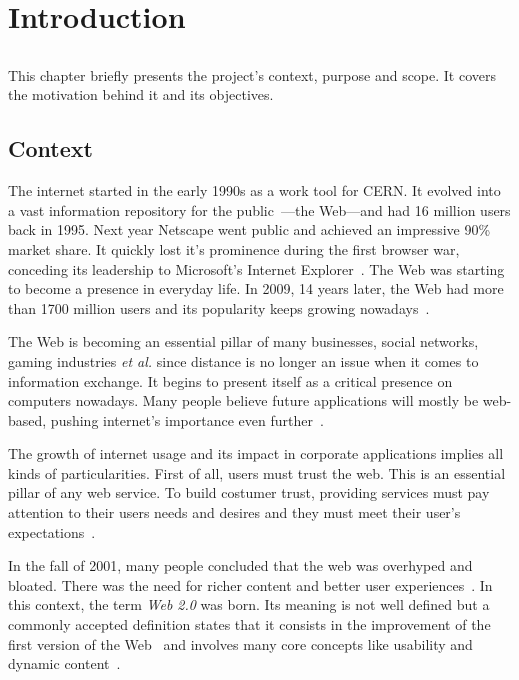 \chapter{Introduction} %
\label{cha:introduction}

\section*{} %
This chapter briefly presents the project's context, purpose and scope. It covers the motivation behind it and its objectives.%


\section{Context} %
\label{sec:context}
The internet started in the early 1990s as a work tool for CERN. It evolved into a vast information repository for the public~\cite{teaching_webdev_web20}---the Web---and had 16 million users back in 1995. Next year Netscape went public and achieved an impressive 90\% market share. It quickly lost it's prominence during the first browser war, conceding its leadership to Microsoft's Internet Explorer~\cite{browser_wars}. The Web was starting to become a presence in everyday life. In 2009, 14 years later, the Web had more than 1700 million users and its popularity keeps growing nowadays~\cite{internet_stats}.

The Web is becoming an essential pillar of many businesses, social networks, gaming industries \textit{et al.} since distance is no longer an issue when it comes to information exchange.  It begins to present itself as a critical presence on computers nowadays. Many people believe future applications will mostly be web-based, pushing internet's importance even further~\cite{browser_application_platform}.

The growth of internet usage and its impact in corporate applications implies all kinds of particularities. First of all, users must trust the web. This is an essential pillar of any web service. To build costumer trust, providing services must pay attention to their users needs and desires and they must meet their user's expectations~\cite{trust_semantic_web}. 

In the fall of 2001, many people concluded that the web was overhyped and bloated. There was the need for richer content and better user experiences~\cite{oreilly_web20}. In this context, the term \textit{Web 2.0} was born. Its meaning is not well defined but a commonly accepted definition states that it consists in the improvement of the first version of the Web~\cite{rubyonrails_tutorial} and involves many core concepts like usability and dynamic content~\cite{what_is_web20}.

